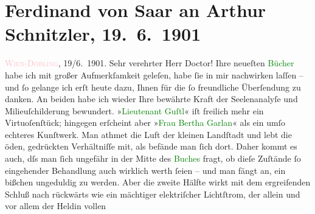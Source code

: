

               \section[Ferdinand von Saar an Arthur Schnitzler, 19. 6. 1901]{ Ferdinand von Saar an Arthur Schnitzler, 19. 6. 1901}\nopagebreak{}\rehead{ }\normalsize\beginnumbering{} \toendnotes[C]{\smallbreak\pagebreak[2]} 
\toendnotes[C]{\smallbreak}\pstart
           \raggedleft{}{\pb}\textcolor{pink}{\textsc{Wien-Döbling}}{}\ledrightnote{\textcolor{pink}{XIX., Döbling}}, 19/6. 1901.\pend
           \pstart{}Sehr verehrter Herr Doctor!\pend\pstart
           Ihre neueſten \textcolor{green}{Bücher}{} habe
               ich mit großer Aufmerkſamkeit geleſen, habe ſie in mir nachwirken laſſen – und ſo
               gelange ich erſt heute dazu, Ihnen für die ſo freundliche Überſendung zu danken. An
               beiden habe ich wieder Ihre bewährte Kraft der Seelenanalyſe und Milieuſchilderung
               bewundert. »\textcolor{green}{Lieutenant Guſtl}{}\ledrightnote{\textcolor{green}{Lieutenant Gustl. Novelle}}« iſt freilich mehr ein
               Virtuoſenſtück; hingegen erſcheint aber »\textcolor{green}{Frau Bertha
                  Garlan}{}\ledrightnote{\textcolor{green}{Frau Bertha Garlan. Roman}}« als ein umſo echteres Kunſtwerk. Man athmet die Luft der kleinen
               Landſtadt und lebt die öden, gedrückten Verhältniſſe mit, als befände man ſich dort.
               Daher kommt es auch, dſs man ſich ungefähr in der Mitte des \textcolor{green}{Buches}{} fragt, ob dieſe Zuſtände ſo eingehender
               Behandlung auch wirklich werth ſeien – und man fängt an, ein bißchen ungeduldig zu
               werden. Aber die zweite Hälfte wirkt mit dem ergreifenden Schluß nach rückwärts wie
               ein mächtiger elektriſcher Lichtſtrom, der allein und vor allem der Heldin vollen
